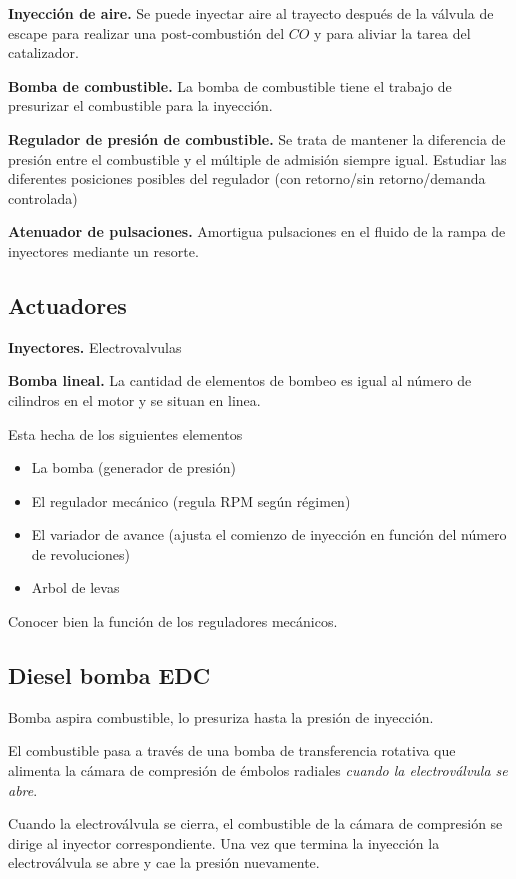 {\bf Inyección de aire.}
Se puede inyectar aire al trayecto después de la válvula de escape para realizar una post-combustión del $CO$ y \HC para aliviar la tarea del catalizador.

{\bf Bomba de combustible.}
La bomba de combustible tiene el trabajo de presurizar el combustible para la inyección.

{\bf Regulador de presión de combustible.}
Se trata de mantener la diferencia de presión entre el combustible y el múltiple de admisión siempre igual. Estudiar las diferentes posiciones posibles del regulador (con retorno/sin retorno/demanda controlada)

{\bf Atenuador de pulsaciones.}
Amortigua pulsaciones en el fluido de la rampa de inyectores mediante un resorte.


\subsection{Actuadores}

{\bf Inyectores.}
Electrovalvulas 

{\bf Bomba lineal.}
La cantidad de elementos de bombeo es igual al número de cilindros en el motor y se situan en linea. 

Esta hecha de los siguientes elementos 

\begin{itemize}
    \item La bomba (generador de presión)
    \item El regulador mecánico (regula RPM según régimen)
    \item El variador de avance (ajusta el comienzo de inyección en función del número de revoluciones)
    \item Arbol de levas
\end{itemize}

Conocer bien la función de los reguladores mecánicos.

\subsection{Diesel bomba EDC}
Bomba aspira combustible, lo presuriza hasta la presión de inyección.

El combustible pasa a través de una bomba de transferencia rotativa que alimenta la cámara de compresión de émbolos radiales \emph{cuando la electroválvula se abre}.

Cuando la electroválvula se cierra, el combustible de la cámara de compresión se dirige al inyector correspondiente. Una vez que termina la inyección la electroválvula se abre y cae la presión nuevamente.

